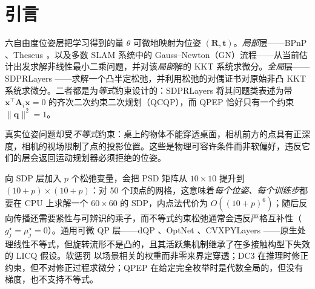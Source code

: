 \section{引言}\label{sec:intro}

六自由度位姿层把学习得到的量 $\theta$ 可微地映射为位姿 $(\mathbf R,\mathbf t)$。\emph{局部}层——BPnP \cite{chen2020bpn}、Theseus \cite{pineda2022theseus}，以及多数 SLAM 系统中的 Gauss--Newton（GN）流程——从当前估计出发求解非线性最小二乘问题，并对该\emph{局部}解的 KKT 系统求微分。\emph{全局}层——SDPRLayers \cite{holmes2025sdpr}——求解一个凸半定松弛，并利用松弛的对偶证书对原始非凸 KKT 系统求微分。二者都是为\emph{等式}约束设计的：SDPRLayers 将其问题类表述为带 $\mathbf x^\top\mathbf A_i\mathbf x=0$ 的齐次二次约束二次规划（QCQP）\cite{holmes2025sdpr}，而 QPEP \cite{wu2022qpep} 恰好只有一个约束 $\|\mathbf q\|^2=1$。

真实位姿问题却受\emph{不等式}约束：桌上的物体不能穿透桌面，相机前方的点具有正深度，相机的视场限制了点的投影位置。这些是物理可容许条件而非软偏好，违反它们的层会返回运动规划器必须拒绝的位姿。

向 SDP 层加入 $p$ 个松弛变量，会把 PSD 矩阵从 $10\times10$ 提升到 $(10+p)\times(10+p)$：对 50 个顶点的网格，这意味着\emph{每个位姿、每个训练步}都要在 CPU 上求解一个 $60\times60$ 的 SDP，内点法代价为 $O((10+p)^6)$；随后反向传播还需要紧性与可辨识的乘子，而不等式约束松弛通常会违反严格互补性（$g_j^\star=\mu_j^\star=0$）。通用可微 QP 层——dQP \cite{magoon2025dqp}、OptNet \cite{amos2017optnet}、CVXPYLayers \cite{agrawal2019cvxpylayers}——原生处理线性不等式，但旋转流形不是凸的，且其活跃集机制继承了在多接触构型下失效的 LICQ 假设。软惩罚 \cite{pineda2022theseus} 以场景相关的权重而非零来界定穿透；DC3 \cite{donti2021dc3} 在推理时修正约束，但不对修正过程求微分；QPEP \cite{wu2022qpep} 在给定完全枚举时是代数全局的，但没有梯度，也不支持不等式。

